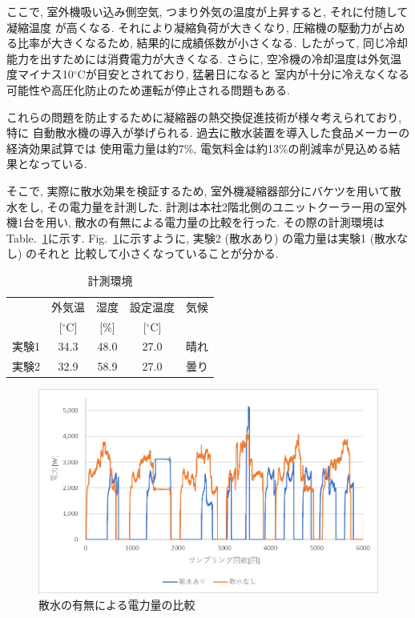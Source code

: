 \documentclass[a4j,fleqn,dvipdfmx,uplatex]{jsarticle}
\newcommand{\figref}[1]{Fig.\ \ref{#1}}
\newcommand{\tableref}[1]{Table.\ \ref{#1}}
\begin{document}
ここで, 室外機吸い込み側空気, つまり外気の温度が上昇すると, それに付随して凝縮温度
が高くなる. それにより凝縮負荷が大きくなり, 圧縮機の駆動力が占める比率が大きくなるため, 
結果的に成績係数が小さくなる. したがって, 同じ冷却能力を出すためには消費電力が大きくなる.  
さらに, 空冷機の冷却温度は外気温度マイナス10$^\circ$Cが目安とされており, 猛暑日になると
室内が十分に冷えなくなる可能性や高圧化防止のため運転が停止される問題もある. 

これらの問題を防止するために凝縮器の熱交換促進技術が様々考えられており, 特に
自動散水機の導入が挙げられる. 過去に散水装置を導入した食品メーカーの経済効果試算では
使用電力量は約7\%, 電気料金は約13\%の削減率が見込める結果となっている\cite{thesis3}. 

そこで, 実際に散水効果を検証するため, 室外機凝縮器部分にバケツを用いて散水をし, 
その電力量を計測した. 計測は本社2階北側のユニットクーラー用の室外機1台を用い, 
散水の有無による電力量の比較を行った. その際の計測環境は\tableref{table:ex1}に示す. 
\figref{fig1:compare_watering}に示すように, 実験2 (散水あり) の電力量は実験1 (散水なし) のそれと
比較して小さくなっていることが分かる.

\begin{table}[htb]
  \caption{計測環境}
  \label{table:ex1}
  \centering
  \begin{tabular}{lcccc}
     & 外気温 & 湿度 & 設定温度 & 気候 \\[-1.5mm]
     & [$^\circ$C] & [\%] & [$^\circ$C] &  \\
    \hline \hline
    実験1 & 34.3 & 48.0 & 27.0 & 晴れ  \\
    実験2 & 32.9 & 58.9 & 27.0 & 曇り \\
    \hline
  \end{tabular}
\end{table}

\begin{figure}[htb]
  \centering
      \includegraphics[width=0.8\linewidth]{img/ex1.png}
      \caption{散水の有無による電力量の比較}
      \label{fig1:compare_watering}
\end{figure}
\end{document}
